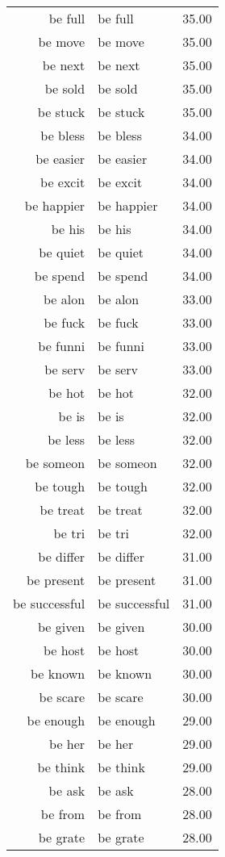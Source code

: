 \begin{table}[ht]
\begin{tabular}{rlr}
  be full & be full & 35.00 \\ 
  be move & be move & 35.00 \\ 
  be next & be next & 35.00 \\ 
  be sold & be sold & 35.00 \\ 
  be stuck & be stuck & 35.00 \\ 
  be bless & be bless & 34.00 \\ 
  be easier & be easier & 34.00 \\ 
  be excit & be excit & 34.00 \\ 
  be happier & be happier & 34.00 \\ 
  be his & be his & 34.00 \\ 
  be quiet & be quiet & 34.00 \\ 
  be spend & be spend & 34.00 \\ 
  be alon & be alon & 33.00 \\ 
  be fuck & be fuck & 33.00 \\ 
  be funni & be funni & 33.00 \\ 
  be serv & be serv & 33.00 \\ 
  be hot & be hot & 32.00 \\ 
  be is & be is & 32.00 \\ 
  be less & be less & 32.00 \\ 
  be someon & be someon & 32.00 \\ 
  be tough & be tough & 32.00 \\ 
  be treat & be treat & 32.00 \\ 
  be tri & be tri & 32.00 \\ 
  be differ & be differ & 31.00 \\ 
  be present & be present & 31.00 \\ 
  be successful & be successful & 31.00 \\ 
  be given & be given & 30.00 \\ 
  be host & be host & 30.00 \\ 
  be known & be known & 30.00 \\ 
  be scare & be scare & 30.00 \\ 
  be enough & be enough & 29.00 \\ 
  be her & be her & 29.00 \\ 
  be think & be think & 29.00 \\ 
  be ask & be ask & 28.00 \\ 
  be from & be from & 28.00 \\ 
  be grate & be grate & 28.00 \\ 

\end{tabular}
\end{table}
